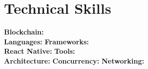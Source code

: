 \section{Technical Skills}
\textbf{Blockchain:} \SkillBlockchain{}\\
\textbf{Languages:} \SkillLanguages{} \quad
\textbf{Frameworks:} \SkillFrameworks{}\\
\textbf{React Native:} \SkillReactNative{} \quad
\textbf{Tools:} \SkillTools{}\\
\textbf{Architecture:} \SkillArchitecture{} \quad
\textbf{Concurrency:} \SkillConcurrency{} \quad
\textbf{Networking:} \SkillNetworking{}
